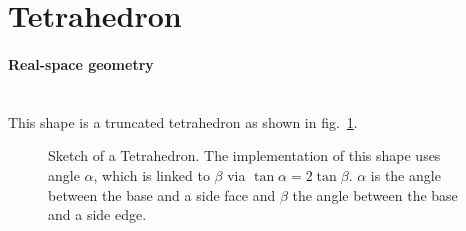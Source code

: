 
\newpage
\section{Tetrahedron} 
 
\paragraph{Real-space geometry}\mbox{}\\
This shape is a truncated tetrahedron as shown in fig.~\ref{fig:tetrahedron}.

\begin{figure}[ht]
\hfill
{}
\hfill
{}
\hfill
\caption{Sketch of a Tetrahedron. The implementation of this shape uses angle
  $\alpha$, which is linked to $\beta$ via $\tan \alpha = 2 \tan 
  \beta$. $\alpha$ is the angle between the base and a side face and $\beta$
  the angle between the base and a side edge.}
\label{fig:tetrahedron}
\end{figure}

